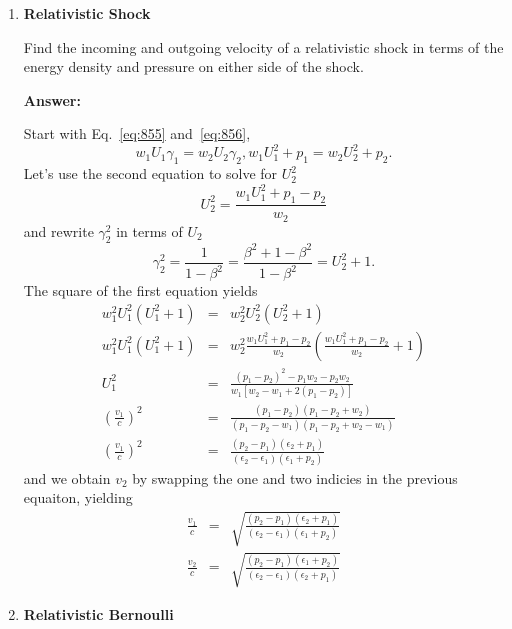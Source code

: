 \documentclass{article}
\begin{document}
\begin{enumerate}
{\bf Answer: }

Eq.~\ref{eq:710}.

\item{\bf Relativistic Shock}

  Find the incoming and outgoing velocity of a relativistic shock in
  terms of the energy density and pressure on either side of the
  shock.

{\bf Answer:}

Start with Eq.~\ref{eq:855} and~\ref{eq:856},
\begin{equation}
 w_1 U_1 \gamma_1= w_2 U_2 \gamma_2, w_1 U_1^2 + p_1 = w_2 U_2^2 + p_2.
\end{equation}
Let's use the second equation to solve for $U_2^2$
\begin{equation}
U_2^2 = \frac{w_1 U_1^2 + p_1 - p_2}{w_2} 
\end{equation}
and rewrite $\gamma_2^2$ in terms of $U_2$
\begin{equation}
\gamma_2^2 = \frac{1}{1-\beta^2} = \frac{\beta^2 + 1 -
  \beta^2}{1-\beta^2} = U_2^2 + 1.
\end{equation}
The square of the first equation yields
\begin{eqnarray}
w_1^2 U_1^2 \left ( U_1^2 + 1 \right ) &=& w_2^2 U_2^2 \left ( U_2^2 +
  1 \right ) \\
w_1^2 U_1^2 \left ( U_1^2 + 1 \right ) &=& w_2^2 \frac{w_1 U_1^2 + p_1 -
  p_2}{w_2} \left ( \frac{w_1 U_1^2 + p_1 - p_2}{w_2}  + 1 \right ) \\
U_1^2 &=& \frac{(p_1-p_2)^2 - p_1 w_2 - p_2 w_2}{w_1 \left [ w_2 - w_1
    + 2 ( p_1 - p_2 ) \right ]} \\
\left ( \frac{v_1}{c} \right )^2 &=&
\frac{(p_1-p_2)(p_1-p_2+w_2)}{(p_1-p_2-w_1)(p_1-p_2+w_2-w_1)} \\
\left ( \frac{v_1}{c} \right )^2 &=&
\frac{(p_2-p_1)(\epsilon_2+p_1)}{(\epsilon_2-\epsilon_1)(\epsilon_1+p_2)} 
\end{eqnarray}
and we obtain $v_2$ by swapping the one and two indicies in the
previous equaiton, yielding 
\begin{eqnarray}
\frac{v_1}{c} &=&
\sqrt{\frac{(p_2-p_1)(\epsilon_2+p_1)}{(\epsilon_2-\epsilon_1)(\epsilon_1+p_2)}} \\
\frac{v_2}{c} &=&
\sqrt{\frac{(p_2-p_1)(\epsilon_1+p_2)}{(\epsilon_2-\epsilon_1)(\epsilon_2+p_1)}} 
\end{eqnarray}

\item{\bf Relativistic Bernoulli}


\end{enumerate}
\end{document}
